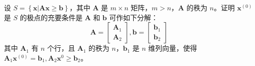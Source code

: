 \begin{problem}
    设 $S = \left\{\boldsymbol{x}|\boldsymbol{A}\boldsymbol{x} \ge \boldsymbol{b}\right\}$，其中 $\boldsymbol{A}$ 是 $m\times n$ 矩阵，$m > n$，$\boldsymbol{A}$ 的秩为 $n$。证明 $\boldsymbol{x}^{(0)}$ 是 $S$ 的极点的充要条件是 $\boldsymbol{A}$ 和 $\boldsymbol{b}$ 可作如下分解：
    \[\boldsymbol{A} = \begin{bmatrix}
        \boldsymbol{A}_1 \\
        \boldsymbol{A}_2
    \end{bmatrix}, \boldsymbol{b} = \begin{bmatrix}
        \boldsymbol{b}_1 \\
        \boldsymbol{b}_2
    \end{bmatrix}\]
    其中 $\boldsymbol{A}_1$ 有 $n$ 个行，且 $\boldsymbol{A}_1$ 的秩为 $n$，$\boldsymbol{b}_1$ 是 $n$ 维列向量，使得 $\boldsymbol{A}_1\boldsymbol{x}^{(0)} = \boldsymbol{b}_1, \boldsymbol{A}_2\boldsymbol{x}^{0} \ge \boldsymbol{b}_2$。
\end{problem}
